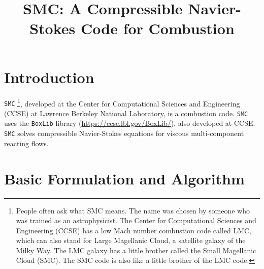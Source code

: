 \documentclass[11pt,letterpaper]{article}
\begin{document}
\title{SMC: A Compressible Navier-Stokes Code for Combustion}
\maketitle

\section{Introduction}

{\tt SMC} {\footnote{People often ask what SMC means.  The name was
    chosen by someone who was trained as an astrophysicist.  The
    Center for Computational Sciences and Engineering (CCSE) has a low
    Mach number combustion code called LMC, which can also stand for
    Large Magellanic Cloud, a satellite galaxy of the Milky Way.  The
    LMC galaxy has a little brother called the Small Magellanic Cloud
    (SMC). The SMC code is also like a little brother of the LMC
    code.}}, developed at the Center for Computational Sciences and
Engineering (CCSE) at Lawrence Berkeley National Laboratory, is a
combustion code.  {\tt SMC} uses the {\tt BoxLib} library
(\url{https://ccse.lbl.gov/BoxLib/}), also developed at CCSE.  {\tt
  SMC} solves compressible Navier-Stokes equations for viscous
multi-component reacting flows.

\section{Basic Formulation and Algorithm}
\end{document}

